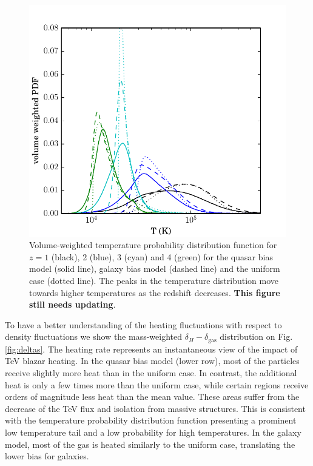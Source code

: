 \documentclass[numberedappendix]{emulateapj}
\newcommand\ALc[1]{{\color{red} \bf #1}} %
\begin{document}
\begin{figure}[h]
\centering
\includegraphics[width = .45\textwidth ]{full_PDF_256_gal_qso.pdf}
\caption{Volume-weighted temperature probability distribution function for $z=1$ (black), 2 (blue), 3 (cyan) and 4 (green) for the quasar bias model (solid line), galaxy bias model (dashed line) and the uniform case (dotted line). The peaks in the temperature distribution move towards higher temperatures as the redshift decreases.\ALc{This figure still needs updating}.}
\label{fig:PDF}
\end{figure}
To have a better understanding of the heating fluctuations with respect to density fluctuations we show the mass-weighted $\delta_H-\delta_{\mathrm{gas}}$ distribution on Fig. \ref{fig:deltas}. The heating rate represents an instantaneous view of the impact of TeV blazar heating. In the quasar bias model (lower row), most of the particles receive slightly more heat than in the uniform case. In contrast, the additional heat is only a few times more than the uniform case, while certain regions receive orders of magnitude less heat than the mean value. These areas suffer from the decrease of the TeV flux and isolation from massive structures. This is consistent with the temperature probability distribution function presenting a prominent low temperature tail and a low probability for high temperatures. In the galaxy model, most of the gas is heated similarly to the uniform case, translating the lower bias for galaxies.
\end{document}
